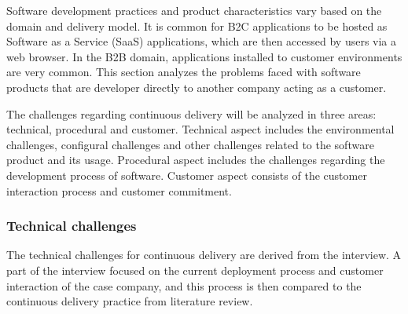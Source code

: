 \documentclass[english]{tktltiki2}
\theoremstyle{definition}
\theoremstyle{remark}
\begin{document}
Software development practices and product characteristics vary based on the domain and delivery model. It is common for B2C applications to be hosted as Software as a Service (SaaS) applications, which are then accessed by users via a web browser. In the B2B domain, applications installed to customer environments are very common. This section analyzes the problems faced with software products that are developer directly to another company acting as a customer.

The challenges regarding continuous delivery will be analyzed in three areas: technical, procedural and customer. Technical aspect includes the environmental challenges, configural challenges and other challenges related to the software product and its usage. Procedural aspect includes the challenges regarding the development process of software. Customer aspect consists of the customer interaction process and customer commitment.

\subsubsection{Technical challenges}
The technical challenges for continuous delivery are derived from the interview. A part of the interview focused on the current deployment process and customer interaction of the case company, and this process is then compared to the continuous delivery practice from literature review.
\end{document}
